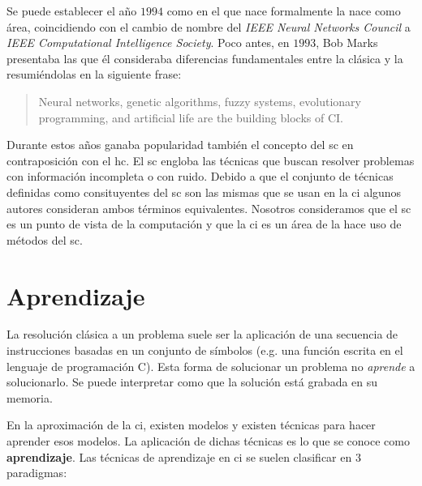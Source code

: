 Se puede establecer el año $1994$ como en el que nace formalmente la  nace como área, coincidiendo con el cambio de nombre del \textit{IEEE Neural Networks Council} a \textit{IEEE Computational Intelligence Society}. Poco antes, en $1993$, Bob Marks presentaba las que él consideraba diferencias fundamentales entre la  clásica y la  resumiéndolas en la siguiente frase:

\blockquote{Neural networks, genetic algorithms, fuzzy systems, evolutionary programming, and artificial life are the building blocks of CI.}

Durante estos años ganaba popularidad también el concepto del \gls{sc} en contraposición con el \gls{hc}. El \gls{sc} engloba las técnicas que buscan resolver problemas con información incompleta o con ruido. Debido a que el conjunto de técnicas definidas como consituyentes del \gls{sc} son las mismas que se usan en la \gls{ci} algunos autores consideran ambos términos equivalentes. Nosotros consideramos que el \gls{sc} es un punto de vista de la computación y que la \gls{ci} es un área de la  hace uso de métodos del \gls{sc}.


\section{Aprendizaje}

La resolución clásica a un problema suele ser la aplicación de una secuencia de instrucciones basadas en un conjunto de símbolos (e.g. una función escrita en el lenguaje de programación C). Esta forma de solucionar un problema no \textit{aprende} a solucionarlo. Se puede interpretar como que la solución está grabada en su memoria.

En la aproximación de la \gls{ci}, existen modelos y existen técnicas para hacer aprender esos modelos. La aplicación de dichas técnicas es lo que se conoce como \textbf{aprendizaje}. Las técnicas de aprendizaje en \gls{ci} se suelen clasificar en $3$ paradigmas:

